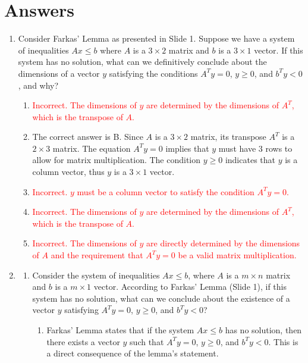 \documentclass{article}%
\newcommand{\incorrect}[1]{\textcolor{red}{#1}}
\begin{document}
\section{Answers}%
\label{sec:Answers}%
\begin{enumerate}%
\item Consider Farkas' Lemma as presented in Slide 1.  Suppose we have a system of inequalities $Ax \le b$ where $A$ is a $3 \times 2$ matrix and $b$ is a $3 \times 1$ vector.  If this system has no solution, what can we definitively conclude about the dimensions of a vector $y$ satisfying the conditions $A^T y = 0$, $y \ge 0$, and $b^T y < 0$, and why?%
\begin{enumerate}%
\item \incorrect{Incorrect.  The dimensions of $y$ are determined by the dimensions of $A^T$, which is the transpose of $A$.}%
\item The correct answer is B.  Since $A$ is a $3 \times 2$ matrix, its transpose $A^T$ is a $2 \times 3$ matrix.  The equation $A^T y = 0$ implies that $y$ must have 3 rows to allow for matrix multiplication. The condition $y \ge 0$ indicates that $y$ is a column vector, thus $y$ is a $3 \times 1$ vector.%
\item \incorrect{Incorrect. $y$ must be a column vector to satisfy the condition $A^T y = 0$.}%
\item \incorrect{Incorrect.  The dimensions of $y$ are determined by the dimensions of $A^T$, which is the transpose of $A$.}%
\item \incorrect{Incorrect. The dimensions of $y$ are directly determined by the dimensions of $A$ and the requirement that $A^T y = 0$ be a valid matrix multiplication.}%
\end{enumerate}%
\vspace{1em}%
\item%
\begin{enumerate}%
\item Consider the system of inequalities $Ax \le b$, where $A$ is a $m \times n$ matrix and $b$ is a $m \times 1$ vector.  According to Farkas' Lemma (Slide 1), if this system has no solution, what can we conclude about the existence of a vector $y$ satisfying $A^T y = 0$, $y \ge 0$, and $b^T y < 0$?%
\begin{enumerate}%
\item Farkas' Lemma states that if the system $Ax \le b$ has no solution, then there exists a vector $y$ such that $A^T y = 0$, $y \ge 0$, and $b^T y < 0$. This is a direct consequence of the lemma's statement.%

\end{enumerate}
\end{enumerate}
\end{enumerate}
\end{document}
